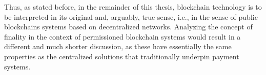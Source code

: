 Thus, as stated before, in the remainder of this thesis, blockchain technology is to be interpreted in its original and, arguably, true sense, i.e., in the sense of public blockchains systems based on decentralized networks.
Analyzing the concept of finality in the context of permissioned blockchain systems would result in a different and much shorter discussion, as these have essentially the same properties as the centralized solutions that traditionally underpin payment systems.
